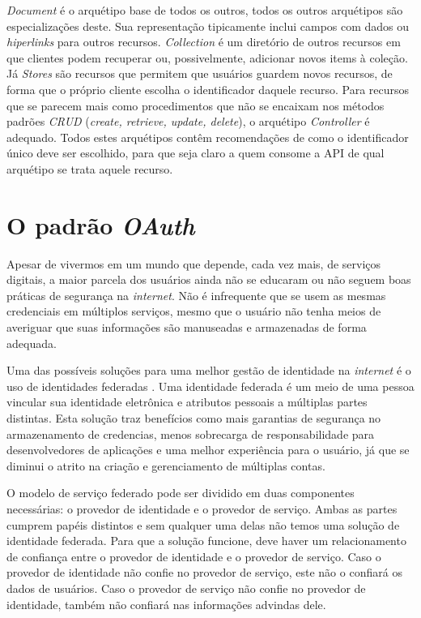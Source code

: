 \emph{Document} é o arquétipo base de todos os outros, todos os outros arquétipos são especializações 
deste. Sua representação tipicamente inclui campos com dados ou \emph{hiperlinks} para outros 
recursos. \emph{Collection} é um diretório de outros recursos em que clientes podem recuperar 
ou, possivelmente, adicionar novos items à coleção. Já \emph{Stores} são recursos que permitem 
que usuários guardem novos recursos, de forma que o próprio cliente escolha o 
identificador daquele recurso. Para recursos que se parecem mais como procedimentos que 
não se encaixam nos métodos padrões \emph{CRUD} (\emph{create, retrieve, update, delete}),
  o arquétipo \emph{Controller} é adequado. Todos estes arquétipos 
  contêm recomendações de como o identificador único deve ser escolhido, para que seja 
  claro a quem consome a API de qual arquétipo se trata aquele recurso.

  \section{O padrão \emph{OAuth}}
  Apesar de vivermos em um mundo que depende, cada vez mais, de serviços digitais,
  a maior parcela dos usuários ainda não se educaram ou 
  não seguem boas práticas de segurança na \emph{internet}. Não é infrequente que se 
  usem as mesmas credenciais em múltiplos serviços, mesmo que o usuário 
  não tenha meios de averiguar que suas informações são manuseadas e armazenadas de forma 
  adequada.

  Uma das possíveis soluções para uma melhor gestão de identidade na \emph{internet} 
  é o uso de identidades federadas \cite{208723}. Uma identidade federada é um meio 
  de uma pessoa vincular sua identidade eletrônica e atributos pessoais 
  a múltiplas partes distintas. Esta solução traz benefícios como mais garantias
  de segurança no armazenamento de credencias, menos sobrecarga de responsabilidade 
  para desenvolvedores de aplicações e uma melhor experiência para o usuário, já que se 
  diminui o atrito na criação e gerenciamento de múltiplas contas.

  O modelo de serviço federado pode ser dividido em duas componentes necessárias: 
  o provedor de identidade e o provedor de serviço. Ambas as partes cumprem papéis 
  distintos e sem qualquer uma delas não temos uma solução de identidade federada. 
  Para que a solução funcione, deve haver um relacionamento de confiança entre 
  o provedor de identidade e o provedor de serviço. Caso o provedor de identidade 
  não confie no provedor de serviço, este não o confiará os dados de usuários.
  Caso o provedor de serviço não confie no provedor de identidade, 
  também não confiará nas informações advindas dele.

